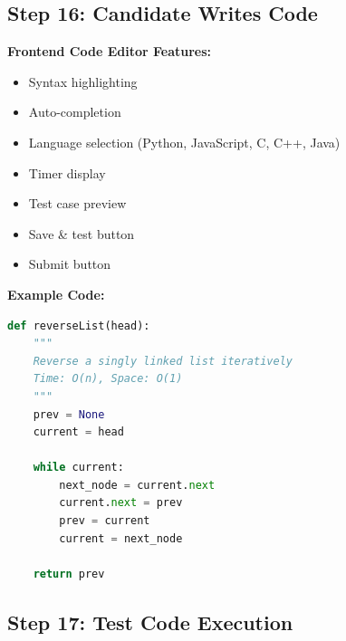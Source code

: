 \documentclass[12pt,a4paper]{article}
\begin{document}
\subsection{Step 16: Candidate Writes Code}

\textbf{Frontend Code Editor Features:}
\begin{itemize}
    \item Syntax highlighting
    \item Auto-completion
    \item Language selection (Python, JavaScript, C, C++, Java)
    \item Timer display
    \item Test case preview
    \item Save \& test button
    \item Submit button
\end{itemize}

\textbf{Example Code:}
\begin{lstlisting}[language=python, caption=Candidate Solution]
def reverseList(head):
    """
    Reverse a singly linked list iteratively
    Time: O(n), Space: O(1)
    """
    prev = None
    current = head
    
    while current:
        next_node = current.next
        current.next = prev
        prev = current
        current = next_node
    
    return prev
\end{lstlisting}

\newpage

\subsection{Step 17: Test Code Execution}
\end{document}
